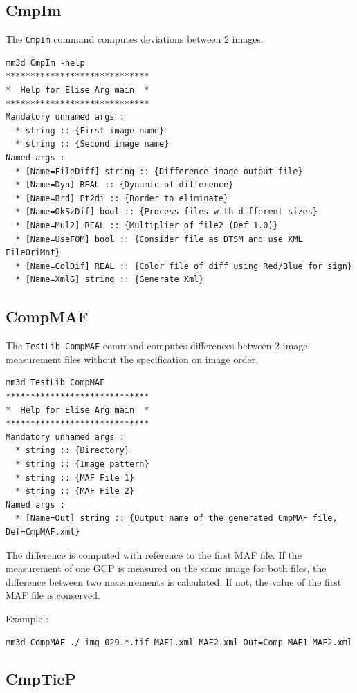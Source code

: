 \subsection{CmpIm}
The {\tt CmpIm} command computes deviations between 2 images.

\begin{verbatim}
mm3d CmpIm -help
*****************************
*  Help for Elise Arg main  *
*****************************
Mandatory unnamed args : 
  * string :: {First image name}
  * string :: {Second image name}
Named args : 
  * [Name=FileDiff] string :: {Difference image output file}
  * [Name=Dyn] REAL :: {Dynamic of difference}
  * [Name=Brd] Pt2di :: {Border to eliminate}
  * [Name=OkSzDif] bool :: {Process files with different sizes}
  * [Name=Mul2] REAL :: {Multiplier of file2 (Def 1.0)}
  * [Name=UseFOM] bool :: {Consider file as DTSM and use XML FileOriMnt}
  * [Name=ColDif] REAL :: {Color file of diff using Red/Blue for sign}
  * [Name=XmlG] string :: {Generate Xml}

\end{verbatim}
\subsection{CompMAF}
The {\tt TestLib CompMAF} command computes differences between 2 image measurement files without the specification on image order.

\begin{verbatim}
mm3d TestLib CompMAF
*****************************
*  Help for Elise Arg main  *
*****************************
Mandatory unnamed args : 
  * string :: {Directory}
  * string :: {Image pattern}
  * string :: {MAF File 1}
  * string :: {MAF File 2}
Named args : 
  * [Name=Out] string :: {Output name of the generated CmpMAF file, Def=CmpMAF.xml}

\end{verbatim}

The difference is computed with reference to the first MAF file. If the measurement of one GCP is measured on the same image for both files, the difference between two measurements is calculated. If not, the value of the first MAF file is conserved.

Example :
\begin{verbatim}
mm3d CompMAF ./ img_029.*.tif MAF1.xml MAF2.xml Out=Comp_MAF1_MAF2.xml
\end{verbatim}

\subsection{CmpTieP}

